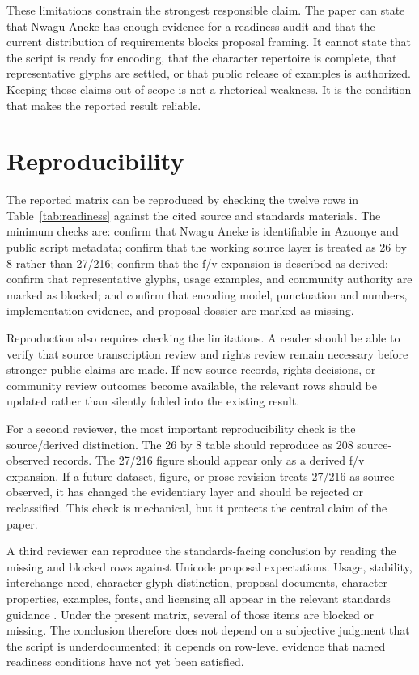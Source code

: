 \documentclass[sigconf,nonacm]{acmart}
\begin{document}
These limitations constrain the strongest responsible claim. The paper can
state that Nwagu Aneke has enough evidence for a readiness audit and that the
current distribution of requirements blocks proposal framing. It cannot state
that the script is ready for encoding, that the character repertoire is
complete, that representative glyphs are settled, or that public release of
examples is authorized. Keeping those claims out of scope is not a rhetorical
weakness. It is the condition that makes the reported result reliable.

\section{Reproducibility}
The reported matrix can be reproduced by checking the twelve rows in
Table~\ref{tab:readiness} against the cited source and standards materials. The
minimum checks are: confirm that Nwagu Aneke is identifiable in Azuonye and
public script metadata; confirm that the working source layer is treated as 26
by 8 rather than 27/216; confirm that the f/v expansion is described as derived;
confirm that representative glyphs, usage examples, and community authority are
marked as blocked; and confirm that encoding model, punctuation and numbers,
implementation evidence, and proposal dossier are marked as missing.

Reproduction also requires checking the limitations. A reader should be able to
verify that source transcription review and rights review remain necessary
before stronger public claims are made. If new source records, rights decisions,
or community review outcomes become available, the relevant rows should be
updated rather than silently folded into the existing result.

For a second reviewer, the most important reproducibility check is the
source/derived distinction. The 26 by 8 table should reproduce as 208
source-observed records. The 27/216 figure should appear only as a derived f/v
expansion. If a future dataset, figure, or prose revision treats 27/216 as
source-observed, it has changed the evidentiary layer and should be rejected or
reclassified. This check is mechanical, but it protects the central claim of
the paper.

A third reviewer can reproduce the standards-facing conclusion by reading the
missing and blocked rows against Unicode proposal expectations. Usage,
stability, interchange need, character-glyph distinction, proposal documents,
character properties, examples, fonts, and licensing all appear in the relevant
standards guidance \cite{unicodeProposals,unicode17CoreSpec}. Under the present
matrix, several of those items are blocked or missing. The conclusion therefore
does not depend on a subjective judgment that the script is underdocumented; it
depends on row-level evidence that named readiness conditions have not yet been
satisfied.
\end{document}
